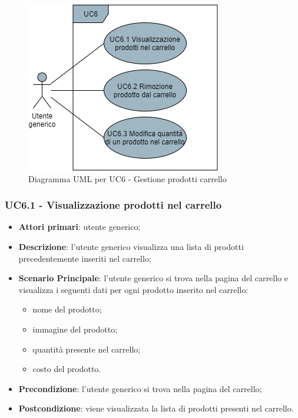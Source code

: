 \begin{figure}[H]
\centering
\includegraphics[scale=0.6]{res/UseCase/Immagini/GestioneCarrello}
\caption{Diagramma UML per UC6 - Gestione prodotti carrello}
\end{figure}

\subsubsection{UC6.1 - Visualizzazione prodotti nel carrello}
\begin{itemize}
\item \textbf{Attori primari}: utente generico;
\item \textbf{Descrizione}: l'utente generico visualizza una lista di prodotti precedentemente inseriti nel carrello;
\item \textbf{Scenario Principale}: l'utente generico si trova nella pagina del carrello e visualizza i seguenti dati per ogni prodotto inserito nel carrello:
\begin{itemize}
\item nome del prodotto;
\item immagine del prodotto;
\item quantità presente nel carrello;
\item costo del prodotto.
\end{itemize}
\item \textbf{Precondizione}: l'utente generico si trova nella pagina del carrello;
\item \textbf{Postcondizione}: viene visualizzata la lista di prodotti presenti nel carrello.
\end{itemize}

